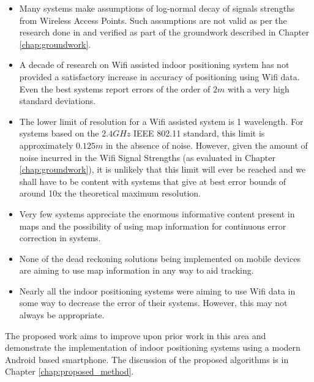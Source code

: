 \begin{itemize}
\item Many systems make assumptions of log-normal decay of signals strengths from Wireless Access Points. Such assumptions are not valid as per the research done in \cite{KStats} and verified as part of the groundwork described in Chapter \ref{chap:groundwork}.
\item A decade of research on Wifi assisted indoor positioning system has not provided a satisfactory increase in accuracy of positioning using Wifi data. Even the best systems report errors of the order of $2 m$ with a very high standard deviations.
\item The lower limit of resolution for a Wifi assisted system is 1 wavelength. For systems based on the $2.4 GHz$ IEEE 802.11 standard, this limit is approximately $0.125 m$ in the absence of noise. However, given the amount of noise incurred in the Wifi Signal Strengths (as evaluated in Chapter \ref{chap:groundwork}), it is unlikely that this limit will ever be reached and we shall have to be content with systems that give at best error bounds of around 10x the theoretical maximum resolution.
\item Very few systems appreciate the enormous informative content present in maps and the possibility of using map information for continuous error correction in systems. 
\item None of the dead reckoning solutions being implemented on mobile devices are aiming to use map information in any way to aid tracking.
\item Nearly all the indoor positioning systems were aiming to use Wifi data in some way to decrease the error of their systems. However, this may not always be appropriate.
\end{itemize}

The proposed work aims to improve upon prior work in this area and demonstrate the implementation of indoor positioning systems using a modern Android based smartphone. The discussion of the proposed algorithms is in Chapter \ref{chap:proposed_method}.



